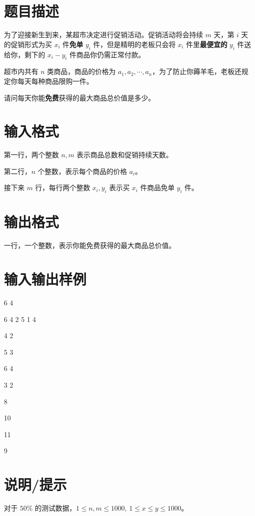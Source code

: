 \documentclass{../cpct/ctpro}
\begin{document}
\makeproblem
\section*{题目描述}

为了迎接新生到来，某超市决定进行促销活动。促销活动将会持续 $m$ 天，第 $i$ 天的促销形式为买 $x_i$ 件\textbf{免单} $y_i$ 件，但是精明的老板只会将 $x_i$ 件里\textbf{最便宜的} $y_i$ 件送给你，剩下的 $x_i-y_i$ 件商品你仍需正常付款。

超市内共有 $n$ 类商品，商品的价格为 $a_1, a_2,\cdots, a_n$，为了防止你薅羊毛，老板还规定你每天每种商品限购一件。

请问每天你能\textbf{免费}获得的最大商品总价值是多少。

\section*{输入格式}

第一行，两个整数 $n,m$ 表示商品总数和促销持续天数。

第二行，$n$ 个整数，表示每个商品的价格 $a_i$。

接下来 $m$ 行，每行两个整数 $x_i,y_i$ 表示买 $x_i$ 件商品免单 $y_i$ 件。

\section*{输出格式}

一行，一个整数，表示你能免费获得的最大商品总价值。

\section*{输入输出样例}
\testcasetab
{
    6 4 \par
    6 4 2 5 1 4 \par
    4 2 \par
    5 3 \par
    6 4 \par
    3 2
}
{
    8 \par
    10 \par
    11 \par
    9
}

\section*{说明/提示}

对于 $50 \%$ 的测试数据，$1 \leq n,m \leq 1000,~1 \leq x \leq y \leq 1000$。
\end{document}
